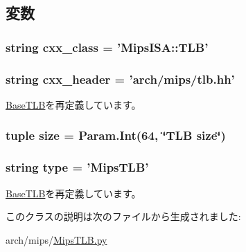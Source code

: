 \subsection{変数}
\hypertarget{classMipsTLB_1_1MipsTLB_a58cd55cd4023648e138237cfc0822ae3}{
\subsubsection[{cxx\_\-class}]{\setlength{\rightskip}{0pt plus 5cm}string {\bf cxx\_\-class} = '{\bf MipsISA::TLB}'}}
\label{classMipsTLB_1_1MipsTLB_a58cd55cd4023648e138237cfc0822ae3}
\hypertarget{classMipsTLB_1_1MipsTLB_a17da7064bc5c518791f0c891eff05fda}{
\subsubsection[{cxx\_\-header}]{\setlength{\rightskip}{0pt plus 5cm}string {\bf cxx\_\-header} = 'arch/mips/tlb.hh'}}
\label{classMipsTLB_1_1MipsTLB_a17da7064bc5c518791f0c891eff05fda}


\hyperlink{classBaseTLB_1_1BaseTLB_a17da7064bc5c518791f0c891eff05fda}{BaseTLB}を再定義しています。\hypertarget{classMipsTLB_1_1MipsTLB_a377e5da8df1f89c5468c8b8cd07eac89}{
\subsubsection[{size}]{\setlength{\rightskip}{0pt plus 5cm}tuple {\bf size} = Param.Int(64, \char`\"{}TLB {\bf size}\char`\"{})}}
\label{classMipsTLB_1_1MipsTLB_a377e5da8df1f89c5468c8b8cd07eac89}
\hypertarget{classMipsTLB_1_1MipsTLB_acce15679d830831b0bbe8ebc2a60b2ca}{
\subsubsection[{type}]{\setlength{\rightskip}{0pt plus 5cm}string {\bf type} = '{\bf MipsTLB}'}}
\label{classMipsTLB_1_1MipsTLB_acce15679d830831b0bbe8ebc2a60b2ca}


\hyperlink{classBaseTLB_1_1BaseTLB_acce15679d830831b0bbe8ebc2a60b2ca}{BaseTLB}を再定義しています。

このクラスの説明は次のファイルから生成されました:\begin{DoxyCompactItemize}
\item 
arch/mips/\hyperlink{MipsTLB_8py}{MipsTLB.py}\end{DoxyCompactItemize}
